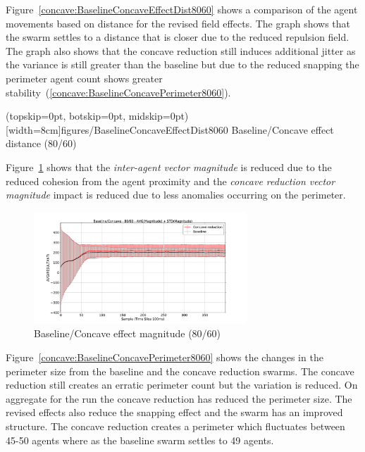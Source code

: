 \documentclass{ieeeaccess}
\begin{document}
Figure~\ref{concave:BaselineConcaveEffectDist8060} shows a comparison of the agent movements based on distance for the revised field effects. The graph shows that the swarm settles to a distance that is closer due to the reduced repulsion field. The graph also shows that the concave reduction still induces additional jitter as the variance is still greater than the baseline but due to the reduced snapping the perimeter agent count shows greater stability~(\ref{concave:BaselineConcavePerimeter8060}). 

\Figure[t!](topskip=0pt, botskip=0pt, midskip=0pt)[width=8cm]{figures/BaselineConcaveEffectDist8060}
{Baseline/Concave effect distance (80/60)\label{concave:BaselineConcaveEffectDist8060}}


Figure~\ref{concave:BaselineConcaveEffectMag8060} shows that the \textit{inter-agent vector magnitude} is reduced due to the reduced cohesion from the agent proximity and the \textit{concave reduction vector magnitude} impact is reduced due to less anomalies occurring on the perimeter.
\begin{figure}
\begin{center}
\includegraphics[width=8cm]{figures/BaselineConcaveEffectMag8060}
\end{center}
\caption{Baseline/Concave effect magnitude (80/60)\label{concave:BaselineConcaveEffectMag8060}}
\end{figure}

Figure~\ref{concave:BaselineConcavePerimeter8060} shows the changes in the perimeter size from the baseline and the concave reduction swarms. The concave reduction still creates an erratic perimeter count but the variation is reduced. On aggregate for the run the concave reduction has reduced the perimeter size. The revised effects also reduce the snapping effect and the swarm has an improved structure. The concave reduction creates a perimeter which fluctuates between 45-50 agents where as the baseline swarm settles to 49 agents.
 
\end{document}
